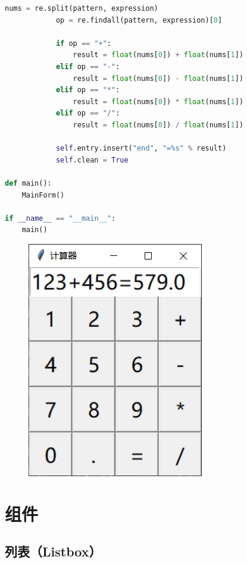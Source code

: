 \begin{lstlisting}[language=Python]
            nums = re.split(pattern, expression)
            op = re.findall(pattern, expression)[0]

            if op == "+":
                result = float(nums[0]) + float(nums[1])
            elif op == "-":
                result = float(nums[0]) - float(nums[1])
            elif op == "*":
                result = float(nums[0]) * float(nums[1])
            elif op == "/":
                result = float(nums[0]) / float(nums[1])
                
            self.entry.insert("end", "=%s" % result)
            self.clean = True

def main():
    MainForm()

if __name__ == "__main__":
    main()
\end{lstlisting}

\begin{tcolorbox}
	\begin{figure}[H]
		\centering
		\includegraphics[scale=0.8]{img/C13/13-3/7.png}
	\end{figure}
\end{tcolorbox}

\newpage

\section{组件}

\subsection{列表（Listbox）}

